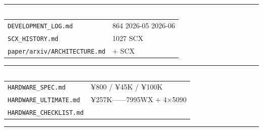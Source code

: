 \documentclass[
  12pt,
]{article}
\begin{document}
\begin{center}\rule{0.5\linewidth}{0.5pt}\end{center}

\subsection{}\label{ux5f00ux53d1ux8bb0ux5f55}

\begin{longtable}[]{@{}ll@{}}
\toprule\noalign{}
 &  \\
\midrule\noalign{}
\endhead
\bottomrule\noalign{}
\endlastfoot
\texttt{DEVELOPMENT\_LOG.md} & 864 2026-05  2026-06 \\
\texttt{SCX\_HISTORY.md} & 1027  SCX  \\
\texttt{paper/arxiv/ARCHITECTURE.md} &  + SCX  \\
\end{longtable}

\begin{center}\rule{0.5\linewidth}{0.5pt}\end{center}

\subsection{}\label{ux786cux4ef6ux89c4ux5212}

\begin{longtable}[]{@{}ll@{}}
\toprule\noalign{}
 &  \\
\midrule\noalign{}
\endhead
\bottomrule\noalign{}
\endlastfoot
\texttt{HARDWARE\_SPEC.md} & ¥800 / ¥45K / ¥100K \\
\texttt{HARDWARE\_ULTIMATE.md} &  ¥257K------7995WX + 4×5090 \\
\texttt{HARDWARE\_CHECKLIST.md} &  \\
\end{longtable}

\begin{center}\rule{0.5\linewidth}{0.5pt}\end{center}

\subsection{}\label{ux836fux7269ux6a21ux5757}
\end{document}
